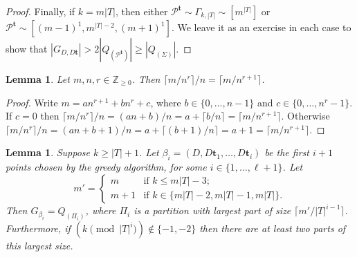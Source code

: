 \documentclass[twoside,a4paper,reqno,11pt]{amsart}
\newcommand{\<}{\langle}
\renewcommand{\>}{\rangle}
\newcommand{\leqs}{\leqslant}
\newcommand{\geqs}{\geqslant}
\newcommand{\minPart}{\Gamma_{k, |T|}}
\newtheorem{lem}[thm]{Lemma}
\theoremstyle{definition}
\begin{document}
\begin{proof}
	Finally, if $k = m|T|$, then either $\mathcal{P}^{\mathbf{t}}\sim \minPart \sim [m^{|T|}]$ or $\mathcal{P}^{\mathbf{t}}\sim [(m-1)^1,m^{|T|-2},(m+1)^1]$. We leave it as an exercise in each case to show that $|G_{D,D\mathbf{t}}| > 2|Q_{(\mathcal{P}^{\mathbf{t}})}| \geqs |Q_{(\Sigma)}|$.
\end{proof}


\begin{lem}\label{l:ceil_divide}
    Let $m, n, r \in \mathbb{Z}_{\geqs 0}$. Then $\lceil m/n^r \rceil/n = \lceil m/n^{r+1} \rceil$.
\end{lem}

\begin{proof}
    Write $m = an^{r+1} + bn^{r} + c$, where $b \in \{0, \ldots, n-1\}$ and $c \in \{0, \ldots, n^r-1\}$.
If $c = 0$ then $\lceil m/n^r \rceil/n = (an + b)/n = a + \lceil b/n \rceil = \lceil m/n^{r+1}\rceil$. Otherwise $\lceil m/n^r \rceil/n = (an + b + 1)/n = a + \lceil (b+1)/n \rceil = a + 1 = \lceil m/n^{r+1} \rceil$. 
\end{proof}

\begin{lem}\label{lem:inductive_step}
    Suppose $k\geqs |T|+1$. Let $\beta_i = (D, D\mathbf{t}_1, \ldots, D\mathbf{t}_i)$ be the first $i+1$ points chosen by the greedy algorithm, for some $i \in \{1, \ldots, \ell+1\}$. Let
    \begin{equation*}
        m' = 
        \begin{cases}
            m & \mbox{if $k\leqs m|T|-3$};\\
            m+1 & \mbox{if $k\in\{m|T|-2, m|T|-1, m|T|\}$}.
        \end{cases}
    \end{equation*}
    Then $G_{\beta_i} = Q_{(\Pi_i)}$, where $\Pi_i$ is a partition with largest part of size 
    $\lceil m'/|T|^{i-1} \rceil$.
    Furthermore, if $(k \pmod{|T|^i}) \not\in \{-1,-2\}$ then there are at least two parts of this largest size.
\end{lem}
\end{document}
